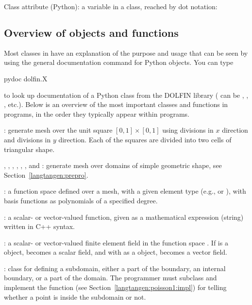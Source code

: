 Class attribute (Python): a variable in a class, reached by dot notation:
\gln

\subsection{Overview of objects and functions}

Most classes in \fenics{} have an explanation of the purpose and usage
that can be seen by using the general documentation command 
for Python objects. You can type
\begin{progoutput}
pydoc dolfin.X
\end{progoutput}
\noindent
to look up documentation of a Python class  from the DOLFIN
library ( can be , , ,
etc.). Below is an overview of the most important classes and functions
in \fenics{} programs, in the order they typically appear within
programs.\gln

: generate mesh over the unit square $[0,1]\times
[0,1]$ using  divisions in $x$ direction and  divisions
in $y$ direction. Each of the  squares are divided into two
cells of triangular shape.\gln

, , , ,
, , and : generate mesh over domains
of simple geometric shape, see Section~\ref{langtangen:prepro}.\gln

: a function space defined
over a mesh, with a given element type (e.g.,  or ),
with basis functions as polynomials of a specified degree.\gln

: a scalar- or vector-valued function, given as a
mathematical expression  (string) written in C++ syntax. \gln

: a scalar- or vector-valued finite element field
in the function space . If  is a 
object,  becomes a scalar field, and with 
as a  object,  becomes a
vector field.\gln

: class for defining a subdomain, either a part of the
boundary, an internal boundary, or a part of the domain.  The programmer
must subclass  and implement the  function (see Section~\ref{langtangen:poisson1:impl})
for telling whether a point  is inside the subdomain or not.  \gln

